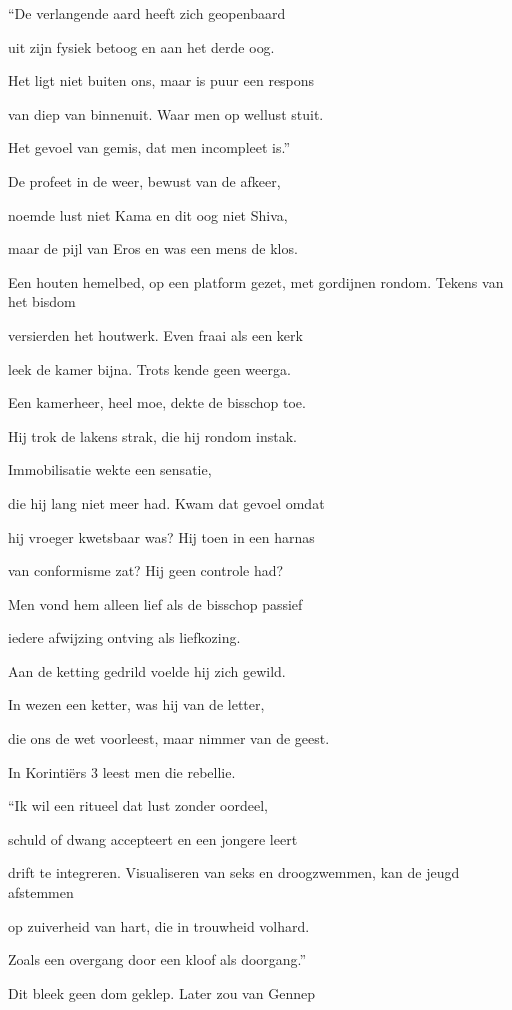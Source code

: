 “De verlangende aard
heeft zich geopenbaard

uit zijn fysiek betoog
en aan het derde oog.

Het ligt niet buiten ons,
maar is puur een respons

van diep van binnenuit.
Waar men op wellust stuit.

Het gevoel van gemis,
dat men incompleet is.”

De profeet in de weer,
bewust van de afkeer,

noemde lust niet Kama
en dit oog niet Shiva,

maar de pijl van Eros
en was een mens de klos.

Een houten hemelbed,
op een platform gezet,
met gordijnen rondom.
Tekens van het bisdom

versierden het houtwerk.
Even fraai als een kerk

leek de kamer bijna.
Trots kende geen weerga.

Een kamerheer, heel moe,
dekte de bisschop toe.

Hij trok de lakens strak,
die hij rondom instak.

Immobilisatie
wekte een sensatie,

die hij lang niet meer had.
Kwam dat gevoel omdat

hij vroeger kwetsbaar was?
Hij toen in een harnas

van conformisme zat?
Hij geen controle had?

Men vond hem alleen lief
als de bisschop passief

iedere afwijzing
ontving als liefkozing.

Aan de ketting gedrild
voelde hij zich gewild.

In wezen een ketter,
was hij van de letter,

die ons de wet voorleest,
maar nimmer van de geest.

In Korintiërs 3
leest men die rebellie.

“Ik wil een ritueel
dat lust zonder oordeel,

schuld of dwang accepteert
en een jongere leert

drift te integreren.
Visualiseren
van seks en droogzwemmen,
kan de jeugd afstemmen

op zuiverheid van hart,
die in trouwheid volhard.

Zoals een overgang
door een kloof als doorgang.”

Dit bleek geen dom geklep.
Later zou van Gennep

